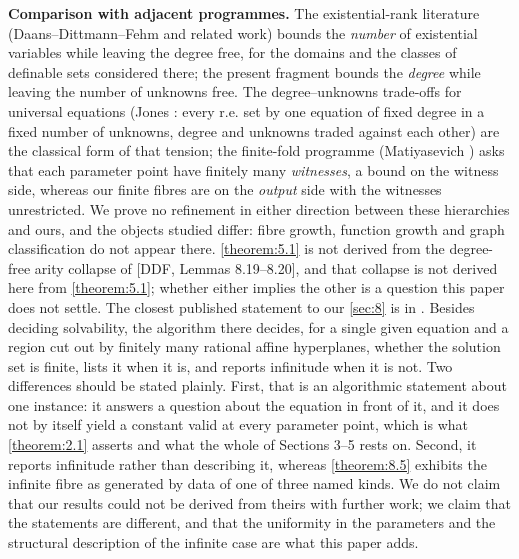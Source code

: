 \documentclass[11pt]{article}
\theoremstyle{plain}
\theoremstyle{definition}
\theoremstyle{remark}
\theoremstyle{plain}
\theoremstyle{definition}
\theoremstyle{remark}
\theoremstyle{plain}
\theoremstyle{definition}
\theoremstyle{remark}
\begin{document}
\textbf{Comparison with adjacent programmes.} The existential-rank literature (Daans–Dittmann–Fehm \cite{DDF} and related work) bounds the \emph{number} of existential variables while leaving the degree free, for the domains and the classes of definable sets considered there; the present fragment bounds the \emph{degree} while leaving the number of unknowns free. The degree–unknowns trade-offs for universal equations (Jones \cite{Jon82}: every r.e. set by one equation of fixed degree in a fixed number of unknowns, degree and unknowns traded against each other) are the classical form of that tension; the finite-fold programme (Matiyasevich \cite{Mat10}) asks that each parameter point have finitely many \emph{witnesses}, a bound on the witness side, whereas our finite fibres are on the \emph{output} side with the witnesses unrestricted. We prove no refinement in either direction between these hierarchies and ours, and the objects studied differ: fibre growth, function growth and graph classification do not appear there. \cref{theorem:5.1} is not derived from the degree-free arity collapse of [DDF, Lemmas 8.19–8.20], and that collapse is not derived here from \cref{theorem:5.1}; whether either implies the other is a question this paper does not settle. The closest published statement to our \cref{sec:8} is in \cite{GS04}. Besides deciding solvability, the algorithm there decides, for a single given equation and a region cut out by finitely many rational affine hyperplanes, whether the solution set is finite, lists it when it is, and reports infinitude when it is not. Two differences should be stated plainly. First, that is an algorithmic statement about one instance: it answers a question about the equation in front of it, and it does not by itself yield a constant valid at every parameter point, which is what \cref{theorem:2.1} asserts and what the whole of Sections 3–5 rests on. Second, it reports infinitude rather than describing it, whereas \cref{theorem:8.5} exhibits the infinite fibre as generated by data of one of three named kinds. We do not claim that our results could not be derived from theirs with further work; we claim that the statements are different, and that the uniformity in the parameters and the structural description of the infinite case are what this paper adds.
\end{document}
